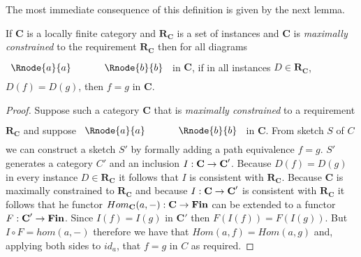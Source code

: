 \documentclass[10pt,a4paper]{article}
\theoremstyle{remark}
\newcommand{\catc}[1][C]{\textbf{#1}}
\newcommand{\catcp}[1][C]{\textbf{#1}'}
\newcommand{\reqt}{\textbf{R}}
\newcommand{\reqtc}[1][\catc]{\reqt_{#1}}
\newcommand{\Fin}{\ensuremath{\textbf{Fin}} }
\newcommand{\term}[1]{\textit{#1}}  %
\begin{document}
The most immediate consequence of this definition is given by the next lemma.
\begin{lemma}
If $\catc$ is a locally finite category and $\reqtc$ is a set of instances  and $\catc$ is 
\term{maximally constrained} to the requirement $\reqtc$ then
for all diagrams
$
\rule[-0.3cm]{0pt}{0.9cm} %
\begin{array}{c p{0.5cm} c  }
 \Rnode{a}{a}            &&   \Rnode{b}{b}
\end{array} 
$
in $\catc$,  if in all instances $D \in \reqtc$, $D(f)=D(g)$, 
then $f=g$ in $\catc$.
\end{lemma}
\begin{proof}
Suppose such a category  $\catc$  that  is 
\term{maximally constrained} to a requirement $\reqtc$
and suppose 
$
\rule[-0.3cm]{0pt}{0.9cm} %
\begin{array}{c p{0.5cm} c  }
 \Rnode{a}{a}            &&   \Rnode{b}{b}
\end{array} 
$
in $\catc$. From sketch $S$ of $C$ we can construct a sketch $S'$ by formally adding a path equivalence $f=g$.
$S'$ generates a category $C'$ and an inclusion $I: \catc \morph \catcp$. Because $D(f) = D(g)$ in every instance $D \in \reqtc$
it follows that $I$ is consistent with $\reqtc$. Because $\catc$ is maximally constrained to $\reqtc$
and because $I: \catc \morph \catcp$ is consistent with $\reqtc$ it follows that he functor $Hom_{\catc}(a,-): \catc \morph \Fin$ 
can be extended to a functor $F: \catcp \morph \Fin$. Since $I(f)=I(g)$ in $\catcp$ then $F(I(f))=F(I(g))$. But $I \circ F
= hom(a,-)$ therefore we have that $Hom(a,f)=Hom(a,g)$ and, applying both sides to $id_a$, that $f=g$ in $C$ as required.
\end{proof}
\end{document}
